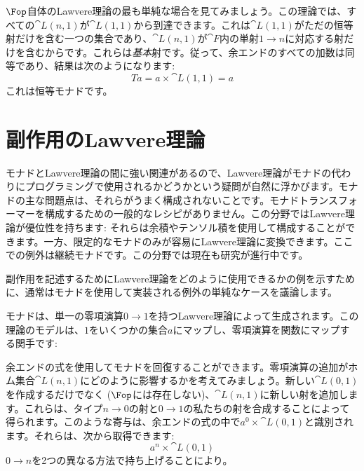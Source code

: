 $\Fop$自体のLawvere理論の最も単純な場合を見てみましょう。この理論では、すべての$\cat{L}(n, 1)$が$\cat{L}(1, 1)$から到達できます。これは$\cat{L}(1, 1)$がただの恒等射だけを含む一つの集合であり、$\cat{L}(n, 1)$が$\cat{F}$内の単射$1 \to n$に対応する射だけを含むからです。これらは\emph{基本}射です。従って、余エンドのすべての加数は同等であり、結果は次のようになります: 
\[T a = a \times \cat{L}(1, 1) = a\]
これは恒等モナドです。

\section{副作用のLawvere理論}

モナドとLawvere理論の間に強い関連があるので、Lawvere理論がモナドの代わりにプログラミングで使用されるかどうかという疑問が自然に浮かびます。モナドの主な問題点は、それらがうまく構成されないことです。モナドトランスフォーマーを構成するための一般的なレシピがありません。この分野ではLawvere理論が優位性を持ちます: それらは余積やテンソル積を使用して構成することができます。一方、限定的なモナドのみが容易にLawvere理論に変換できます。ここでの例外は継続モナドです。この分野では現在も研究が進行中です。

副作用を記述するためにLawvere理論をどのように使用できるかの例を示すために、通常はモナドを使用して実装される例外の単純なケースを議論します。

モナドは、単一の零項演算$0 \to 1$を持つLawvere理論によって生成されます。この理論のモデルは、$1$をいくつかの集合$a$にマップし、零項演算を関数にマップする関手です: 

余エンドの式を使用してモナドを回復することができます。零項演算の追加がホム集合$\cat{L}(n, 1)$にどのように影響するかを考えてみましょう。新しい$\cat{L}(0, 1)$を作成するだけでなく ($\Fop$には存在しない)、$\cat{L}(n, 1)$に新しい射を追加します。これらは、タイプ$n \to 0$の射と$0 \to 1$の私たちの射を合成することによって得られます。このような寄与は、余エンドの式の中で$a^0 \times \cat{L}(0, 1)$と識別されます。それらは、次から取得できます: 
\[a^n \times \cat{L}(0, 1)\]
$0 \to n$を2つの異なる方法で持ち上げることにより。

\begin{figure}[H]
  \centering
\end{figure}

